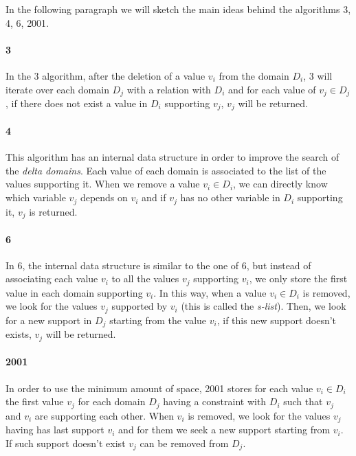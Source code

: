 \documentclass{rapport}
\begin{document}
In the following paragraph we will sketch the main ideas behind the algorithms \ac{3}, \ac{4}, \ac{6}, \ac{2001}.

\paragraph{\ac{3}}

In the \ac{3} algorithm, after the deletion of a value $v_i$ from the domain $D_i$, \ac{3} will iterate over each domain $D_j$ with a relation with $D_i$ and for each value of $v_j \in D_j$, if there does not exist a value in $D_i$ supporting $v_j$, $v_j$ will be returned.

\paragraph{\ac{4}}

This algorithm has an internal data structure in order to improve the search of the \textit{delta domains}. Each value of each domain is associated to the list of the values supporting it. When we remove a value $v_i \in D_i$, we can directly know which variable $v_j$ depends on $v_i$ and if $v_j$ has no other variable in $D_i$ supporting it, $v_j$ is returned.

\paragraph{\ac{6}}

In \ac{6}, the internal data structure is similar to the one of \ac{6}, but instead of associating each value $v_i$ to all the values $v_j$ supporting $v_i$, we only store the first value in each domain supporting $v_i$. In this way, when a value $v_i \in D_i$ is removed, we look for the values $v_j$ supported by $v_i$ (this is called the \textit{s-list}). Then, we look for a new support in $D_j$ starting from the value $v_i$, if this new support doesn't exists, $v_j$ will be returned.

\paragraph{\ac{2001}}

In order to use the minimum amount of space, \ac{2001} stores for each value $v_i \in D_i$ the first value $v_j$ for each domain $D_j$ having a constraint with $D_i$ such that $v_j$ and $v_i$ are supporting each other. When $v_i$ is removed, we look for the values $v_j$ having has last support $v_i$ and for them we seek a new support starting from $v_i$. If such support doesn't exist $v_j$ can be removed from $D_j$.
\end{document}
